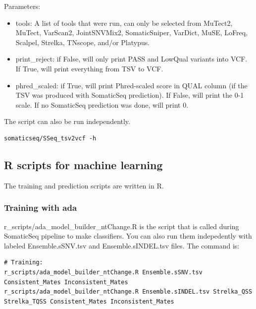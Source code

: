 \documentclass[10pt,letterpaper]{article}
\begin{document}
\begin{sloppypar}
Parameters:

\begin{itemize}

\item tools: A list of tools that were run, can only be selected from MuTect2, MuTect, VarScan2, JointSNVMix2, SomaticSniper, VarDict, MuSE, LoFreq, Scalpel, Strelka, TNscope, and/or Platypus. 

\item print\_reject: if False, will only print PASS and LowQual variants into VCF. If True, will print everything from TSV to VCF. 

\item phred\_scaled: if True, will print Phred-scaled score in QUAL column (if the TSV was produced with SomaticSeq prediction). If False, will print the 0-1 scale. If no SomaticSeq prediction was done, will print 0. 


\end{itemize}

The script can also be run independently. 

\begin{lstlisting}
somaticseq/SSeq_tsv2vcf -h
\end{lstlisting}





\subsection{R scripts for machine learning} \label{module:r_scripts}

The training and prediction scripts are written in R.

\subsubsection{Training with ada} \label{module:r_train}

r\_scripts/ada\_model\_builder\_ntChange.R is the script that is called during SomaticSeq pipeline to make classifiers. You can also run them indepedently with labeled Ensemble.sSNV.tsv and Ensemble.sINDEL.tsv files. The command is:

\begin{lstlisting}
# Training:
r_scripts/ada_model_builder_ntChange.R Ensemble.sSNV.tsv   Consistent_Mates Inconsistent_Mates
r_scripts/ada_model_builder_ntChange.R Ensemble.sINDEL.tsv Strelka_QSS Strelka_TQSS Consistent_Mates Inconsistent_Mates
\end{lstlisting}
      

\end{sloppypar}
\end{document}
